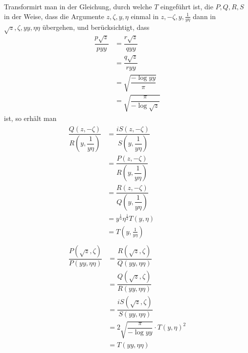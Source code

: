 Transformirt man in der Gleichung, durch welche $T$ eingeführt ist, die $P,\allowbreak Q,\allowbreak R,\allowbreak S$ in der Weise, dass die Argumente $z,\allowbreak \zeta,\allowbreak y,\allowbreak \eta$ einmal in $z,\allowbreak -\zeta,\allowbreak y,\allowbreak \frac{1}{y\eta}$ dann in $\surd  z,\allowbreak \zeta,\allowbreak yy,\allowbreak \eta\eta$ übergehen, und berücksichtigt, dass
\[
\begin{aligned}\dfrac{p\surd  z}{pyy}&=\dfrac{r\surd  z}{qyy}\\[7pt]&=\dfrac{q\surd  z}{ryy}\\[7pt]&=\surd {\dfrac{-\log yy}{\pi}}\\[7pt]&=\surd {\dfrac{\pi}{-\log\surd  z}}\end{aligned}
\]
ist, so erhält man
\[
\begin{gathered}\begin{aligned}\dfrac{Q(z,-\zeta)}{R(y,\dfrac{1}{y\eta})}&=\dfrac{iS(z,-\zeta)}{S(y,\dfrac{1}{y\eta})}\\[7pt]&=\dfrac{P(z,-\zeta)}{R(y,\dfrac{1}{y\eta})}\\[7pt]&=\dfrac{R(z,-\zeta)}{Q(y,\dfrac{1}{y\eta})}\\[7pt]&=y^{\frac14}\eta^{\frac12}T(y,\eta)\\[7pt]&=T(y,\tfrac{1}{y\eta})\end{aligned}\\[10pt]\begin{aligned}\dfrac{P(\surd  z,\zeta)}{P(yy,\eta\eta)}&=\dfrac{R(\surd  z,\zeta)}{Q(yy,\eta\eta)}\\[7pt]&=\dfrac{Q(\surd  z,\zeta)}{R(yy,\eta\eta)}\\[7pt]&=\dfrac{iS(\surd  z,\zeta)}{S(yy,\eta\eta)}\\[7pt]&=2\surd {\dfrac{\pi}{-\log yy}}\cdot T(y,\eta)^2\\[7pt]&=T(yy,\eta\eta)\end{aligned}\end{gathered}
\]


